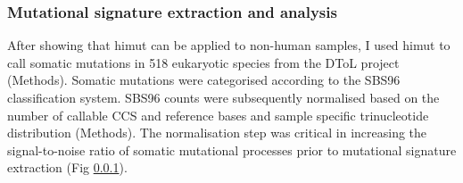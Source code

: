 %


\subsubsection{Mutational signature extraction and analysis}

After showing that himut can be applied to non-human samples, I used himut to call somatic mutations in 518 eukaryotic species from the DToL project (Methods). Somatic mutations were categorised according to the SBS96 classification system. SBS96 counts were subsequently normalised based on the number of callable CCS and reference bases and sample specific trinucleotide distribution (Methods). The normalisation step was critical in increasing the signal-to-noise ratio of somatic mutational processes prior to mutational signature extraction (Fig \ref{}). 

%

